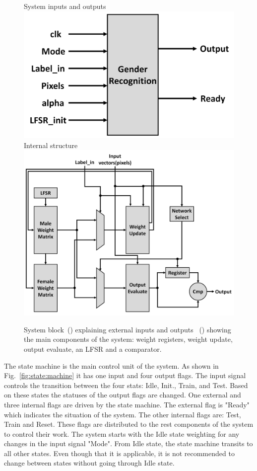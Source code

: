 \documentclass[10pt,journal]{IEEEtran}
\newcommand{\fig}[1]{Fig.~\ref{#1}}
\begin{document}
	\begin{figure}[h]
					\captionsetup[subfigure]{position=b}
					\centering
					\hfill
					\subcaptionbox
					{
						System inputs and outputs
						\label{fig:System:block}
					}
					{\includegraphics[width=0.9\columnwidth]{System_block}}
					\hfill
					\subcaptionbox
					{
						Internal structure
						\label{fig:full:system}
					}
					{\includegraphics[width=0.9\columnwidth]{Full_system}}
					\hfill
					\caption{System block~() explaining external inputs and outputs ~() showing the main components of the system: weight registers, weight update, output evaluate, an LFSR and a comparator.}
					\label{fig:hardware:system}
				\end{figure}
				
				
				
The state machine is the main control unit of the system. As shown in \fig{fig:state:machine} it has one input and four output flags. The input signal controls the transition between the four stats: Idle, Init., Train, and Test. Based on these states the statuses of the output flags are changed.  One external and three internal flags are driven by the state machine. The external flag is "Ready" which indicates the situation of the system. The other internal flags are: Test, Train and Reset. These flags are distributed to the rest components of the system to control their work.  The system starts with the Idle state weighting for any changes in the input signal "Mode". From Idle state, the state machine transits to all other states. Even though that it is applicable, it is not recommended to change between states without going through Idle state.
\end{document}
